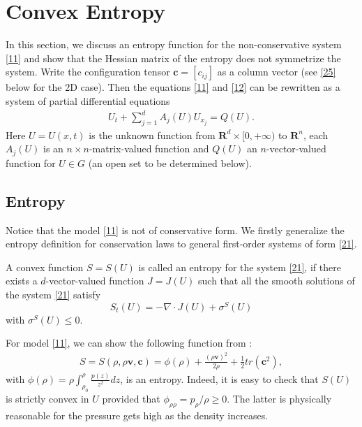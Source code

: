 \documentclass{article}
\theoremstyle{plain}
\begin{document}
\section{Convex Entropy}
\setcounter{equation}{0}

In this section, we discuss an entropy function for the non-conservative system \eqref{11} and show that the Hessian matrix of the entropy does not symmetrize the system. Write the configuration tensor $\mathbf{c}=[c_{ij}]$ as a column vector (see \eqref{25} below for the 2D case). Then the equations \eqref{11} and \eqref{12} can be rewritten as a system of partial differential equations
\begin{eqnarray}\label{21}
  U_t + \sum_{j=1}^d A_j(U) U_{x_j} = Q(U).
\end{eqnarray}
Here $U=U(x, t)$ is the unknown function from $\mathbf{R}^d \times [0,+\infty)$ to $\mathbf{R}^n$, each $A_j(U)$ is an $n\times n$-matrix-valued function and $Q(U)$ an $n$-vector-valued function for $U\in G$ (an open set to be determined below).



\subsection{Entropy}
Notice that the model \eqref{11} is not of conservative form. We firstly generalize the entropy definition for conservation laws \cite{friedrichs1971systems} to general first-order systems of form \eqref{21}.

\begin{defn}
A convex function $S=S(U)$ is called an entropy for the system \eqref{21}, if there exists a $d$-vector-valued function $J=J(U)$ such that all the smooth solutions of the system \eqref{21} satisfy
$$
S_t(U) = -\nabla \cdot J(U) + \sigma^S(U)
$$
with $\sigma^S(U) \le 0$.
\end{defn}

For model \eqref{11}, we can show the following function from \cite{ottinger2005beyond,yong2014newtonian}:
\begin{eqnarray}\label{22}
  S = S(\rho,\rho \mathbf{v} ,\mathbf{c}) = \phi(\rho) + \frac{(\rho \mathbf{v})^2}{2\rho} + \frac{1}{2} tr(\mathbf{c}^2),
  \end{eqnarray}
with $\phi(\rho) = \rho \int_{\rho_0}^\rho \frac{p(z)}{z^2} dz$, is an entropy. Indeed, it is easy to check that $S(U)$ is strictly convex in $U$ provided that $\phi_{\rho \rho} = p_{\rho} / \rho \ge 0$. The latter is physically reasonable for the pressure gets high as the density increases.
\end{document}
